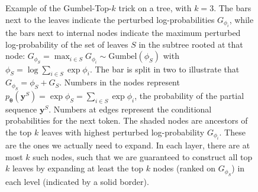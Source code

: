 \begin{figure}[t]
\vskip -0.2cm
\caption{Example of the Gumbel-Top-$k$ trick on a tree, with $k = 3$.  The bars next to the leaves indicate the perturbed log-probabilities $G_{\phi_i}$, while the bars next to internal nodes indicate the maximum perturbed log-probability of the set of leaves $S$ in the subtree rooted at that node: $G_{\phi_S} = \max_{i \in S} G_{\phi_i} \sim \text{Gumbel}(\phi_S)$ with $\phi_S = \log \sum_{i \in S} \exp{\phi_i}$. The bar is split in two to illustrate that $G_{\phi_S} = \phi_S + G_S$. Numbers in the nodes represent $p_{\bm{\theta}}(\bm{y}^S) = \exp{\phi_S} = \sum_{i \in S} \exp{\phi_i}$, the probability of the partial sequence $\bm{y}^S$. Numbers at edges represent the conditional probabilities for the next token. The shaded nodes are ancestors of the top $k$ leaves with highest perturbed log-probability $G_{\phi_i}$. These are the ones we actually need to expand. In each layer, there are at most $k$ such nodes, such that we are guaranteed to construct all top $k$ leaves by expanding at least the top $k$ nodes (ranked on $G_{\phi_S}$) in each level (indicated by a solid border).
}
\label{fig:tree}
\vskip -0.4cm
\end{figure}
